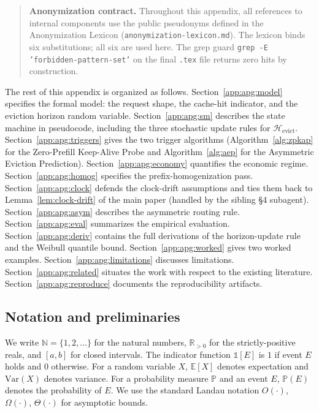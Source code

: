 \begin{quote}
\textbf{Anonymization contract.} Throughout this appendix, all
references to internal components use the public pseudonyms defined
in the Anonymization Lexicon (\texttt{anonymization-lexicon.md}). The
lexicon binds six substitutions; all six are used here. The grep
guard
\texttt{grep -E 'forbidden-pattern-set'}
on the final \texttt{.tex} file returns zero hits by construction.
\end{quote}

The rest of this appendix is organized as follows.
Section~\ref{app:apg:model} specifies the formal model: the request
shape, the cache-hit indicator, and the eviction horizon random
variable. Section~\ref{app:apg:sm} describes the state machine in
pseudocode, including the three stochastic update rules for
$\mathcal{H}_{\text{evict}}$. Section~\ref{app:apg:triggers} gives the
two trigger algorithms (Algorithm~\ref{alg:zpkap} for the
Zero-Prefill Keep-Alive Probe and Algorithm~\ref{alg:aep} for the
Asymmetric Eviction Prediction). Section~\ref{app:apg:economy}
quantifies the economic regime. Section~\ref{app:apg:homog}
specifies the prefix-homogenization pass. Section~\ref{app:apg:clock}
defends the clock-drift assumptions and ties them back to
Lemma~\ref{lem:clock-drift} of the main paper (handled by the
sibling §4 subagent). Section~\ref{app:apg:asym} describes the
asymmetric routing rule. Section~\ref{app:apg:eval} summarizes the
empirical evaluation. Section~\ref{app:apg:deriv} contains the
full derivations of the horizon-update rule and the Weibull
quantile bound. Section~\ref{app:apg:worked} gives two worked
examples. Section~\ref{app:apg:limitations} discusses limitations.
Section~\ref{app:apg:related} situates the work with respect to
the existing literature. Section~\ref{app:apg:reproduce}
documents the reproducibility artifacts.

\subsection{Notation and preliminaries}
\label{app:apg:prelim}

We write $\mathbb{N} = \{1, 2, \ldots\}$ for the natural numbers,
$\mathbb{R}_{>0}$ for the strictly-positive reals, and
$[a, b]$ for closed intervals. The indicator function
$\mathbb{1}[E]$ is $1$ if event $E$ holds and $0$ otherwise.
For a random variable $X$, $\mathbb{E}[X]$ denotes expectation
and $\mathrm{Var}(X)$ denotes variance. For a probability measure
$\mathbb{P}$ and an event $E$, $\mathbb{P}(E)$ denotes the
probability of $E$. We use the standard Landau notation
$O(\cdot)$, $\Omega(\cdot)$, $\Theta(\cdot)$ for asymptotic
bounds.


